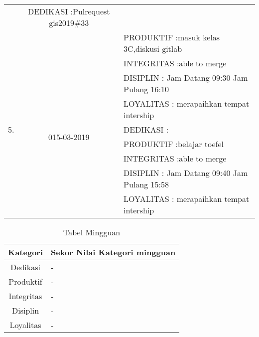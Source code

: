 \begin{table}[h]
\begin{tabular}{|c|c|l|}
&DEDIKASI :Pulrequest gis2019\#33 \\
&&PRODUKTIF :masuk kelas 3C,diskusi gitlab\\
&&INTEGRITAS :able to merge\\
&&DISIPLIN : Jam Datang 09:30 Jam Pulang 16:10\\
&&LOYALITAS : merapaihkan tempat intership\\
\hline
5.&\multirow{2}{*}{015-03-2019}
&DEDIKASI : \\
&&PRODUKTIF :belajar toefel\\
&&INTEGRITAS :able to merge\\
&&DISIPLIN : Jam Datang 09:40 Jam Pulang 15:58\\
&&LOYALITAS : merapaihkan tempat intership\\
\hline
\end{tabular}
\label{table:contoh}
\end{table}

\begin{table}[h]
\begin{center}
\caption{Tabel Mingguan}
\begin{tabular}{|c|l|}
\hline
Kategori& Sekor Nilai Kategori mingguan\\
\hline
Dedikasi & -\\
\hline
Produktif & -\\
\hline
Integritas & -\\
\hline
Disiplin & -\\
\hline
Loyalitas & -\\
\hline
\end{tabular}
\end{center}
\label {Tabel:contoh} 
\end{table}

